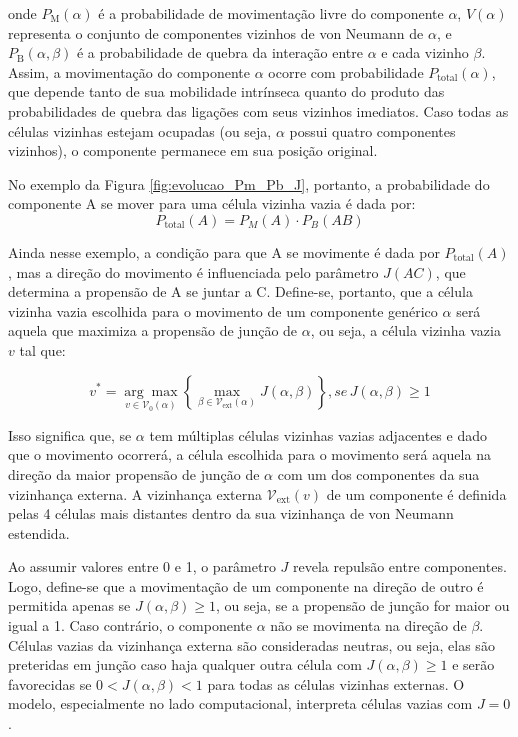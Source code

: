 \documentclass[12pt,oneside]{report}
\begin{document}
onde $P_\text{M}(\alpha)$ é a probabilidade de movimentação livre do componente $\alpha$, $V(\alpha)$ representa o conjunto de componentes vizinhos de von Neumann de $\alpha$, e $P_\text{B}(\alpha, \beta)$ é a probabilidade de quebra da interação entre $\alpha$ e cada vizinho $\beta$. Assim, a movimentação do componente $\alpha$ ocorre com probabilidade $P_\text{total}(\alpha)$, que depende tanto de sua mobilidade intrínseca quanto do produto das probabilidades de quebra das ligações com seus vizinhos imediatos. Caso todas as células vizinhas estejam ocupadas (ou seja, $\alpha$ possui quatro componentes vizinhos), o componente permanece em sua posição original.

No exemplo da Figura \ref{fig:evolucao_Pm_Pb_J}, portanto, a probabilidade do componente A se mover para uma célula vizinha vazia é dada por:
\begin{equation}
    P_\text{total}(A) = P_M(A) \cdot P_B(AB)
\end{equation}

Ainda nesse exemplo, a condição para que A se movimente é dada por $P_\text{total}(A)$, mas a direção do movimento é influenciada pelo parâmetro $J(AC)$, que determina a propensão de A se juntar a C. Define-se, portanto, que a célula vizinha vazia escolhida para o movimento de um componente genérico $\alpha$ será aquela que maximiza a propensão de junção de $\alpha$, ou seja, a célula vizinha vazia $v$ tal que:

\begin{equation}
    v^* = \underset{v \in \mathcal{V}_0(\alpha)}{\arg\max} \left\{ \max_{\beta \in \mathcal{V}_\text{ext}(\alpha)} J(\alpha, \beta) \right\}, se \, J(\alpha, \beta) \geq 1
\end{equation}

Isso significa que, se $\alpha$ tem múltiplas células vizinhas vazias adjacentes e dado que o movimento ocorrerá, a célula escolhida para o movimento será aquela na direção da maior propensão de junção de $\alpha$ com um dos componentes da sua vizinhança externa. A vizinhança externa $\mathcal{V}_\text{ext}(v)$ de um componente é definida pelas 4 células mais distantes dentro da sua vizinhança de von Neumann estendida.

Ao assumir valores entre 0 e 1, o parâmetro $J$ revela repulsão entre componentes. Logo, define-se que a movimentação de um componente na direção de outro é permitida apenas se $J(\alpha, \beta) \geq 1$, ou seja, se a propensão de junção for maior ou igual a 1. Caso contrário, o componente $\alpha$ não se movimenta na direção de $\beta$. Células vazias da vizinhança externa são consideradas neutras, ou seja, elas são preteridas em junção caso haja qualquer outra célula com $J(\alpha, \beta) \geq 1$ e serão favorecidas se $0 < J(\alpha, \beta) < 1$ para todas as células vizinhas externas. O modelo, especialmente no lado computacional, interpreta células vazias com $J = 0$.
\end{document}
